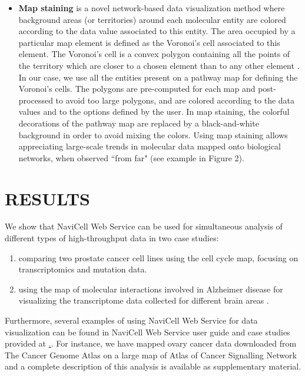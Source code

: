 \documentclass[a4,center,fleqn]{NAR}
\begin{document}
\begin{itemize}
\item \textbf{Map staining} is a novel network-based data visualization method where
background areas (or territories) around each molecular entity are colored according to the data
value associated to this entity. The area occupied by a particular map element is defined as the Voronoi's cell
associated to this element. The Voronoi's cell is a convex polygon containing all the points
of the territory which are closer to a chosen element than to any other element
\cite{aurenhammer1991voronoi}. In our case, we use all the entities present on a pathway map
for defining the Voronoi's cells. The polygons are pre-computed for each map and post-processed
to avoid too large polygons, and are colored according to the data values and to the options
defined by the user. In map staining, the colorful decorations of the pathway map
are replaced by a black-and-white background in order to avoid mixing the colors.
Using map staining allows appreciating large-scale trends in molecular data mapped
onto biological networks, when observed ``from far" (see example in Figure 2).

\end{itemize}



\section{RESULTS}

We show that NaviCell Web Service can be used for simultaneous analysis of
different types of high-throughput data in two case studies:
\begin{enumerate}
\item comparing two prostate cancer cell lines using the cell cycle map,
focusing on transcriptomics and mutation data.

\item using the map of molecular interactions involved in Alzheimer disease
\cite{Mizuno2012} for visualizing the transcriptome data collected for
different brain areas \cite{Hokama2014}.
\end{enumerate}

Furthermore, several examples of using NaviCell Web Service for data
visualization can be found in NaviCell Web Service user guide and case studies
provided at \href{http://navicell.curie.fr/pages/nav\_web\_service.html}.. For
instance, we have mapped ovary cancer data downloaded from The Cancer Genome
Atlas \cite{TCGA2011Ovarian} on a large map of Atlas of Cancer Signalling
Network \cite{Kuperstein2015} and a complete description of this analysis is
available as supplementary material.
\end{document}
